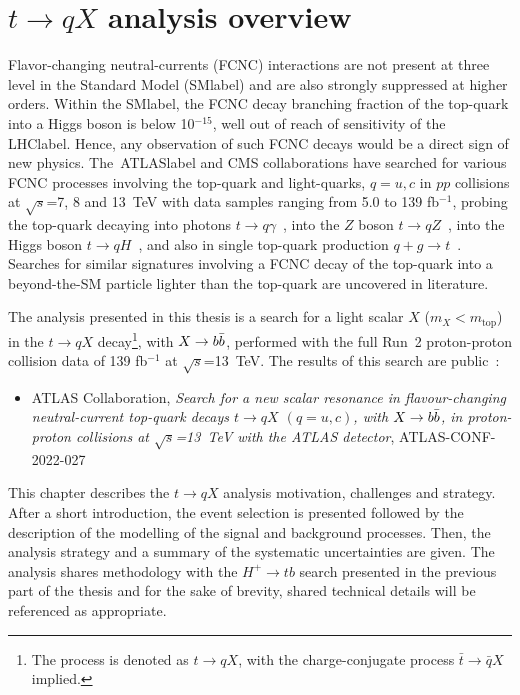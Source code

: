 \chapter{$t\to qX$ analysis overview}

Flavor-changing neutral-currents (FCNC) interactions are not present at three level in the Standard Model (\acrshort{SMlabel}) and are also strongly suppressed at higher orders. Within the \acrshort{SMlabel}, the FCNC decay branching fraction of the top-quark into a Higgs boson is below 10$^{-15}$, well out of reach of sensitivity of the \acrshort{LHClabel}. Hence, any observation of such FCNC decays would be a direct sign of new physics.
The~\acrshort{ATLASlabel} and CMS collaborations have searched for various FCNC processes involving the top-quark and light-quarks, $q=u,c$ in $pp$ collisions at $\sqrt{s}$=7, 8 and 13~TeV with data samples ranging from 5.0 to 139 fb$^{-1}$, probing the top-quark decaying into photons $t\to q\gamma$~\cite{tqgamma2022,tqgamma2020,tqgamma2015CMS,Tumasyan_2022}, into the $Z$ boson $t\to qZ$~\cite{Sirunyan_2017,tqZ2018,ATLAS-CONF-2021-049,CMS-PAS-TOP-17-017}, into the Higgs boson $t\to qH$~\cite{ATLAStqHtautau,TOPQ-2017-07,CMStqHRun2,Khachatryan_2017}, and also in single top-quark production $q+g\to t$~\cite{tqgluon2016,tqgluon2021,tqgluon2017CMS}. Searches for similar signatures involving a FCNC decay of the top-quark into a beyond-the-SM particle lighter than the top-quark are uncovered in literature.

The analysis presented in this thesis is a search for a light scalar $X$ ($m_X < m_\text{top}$) in the $t\to qX$ decay\footnote{The process is denoted as $t\to qX$, with the charge-conjugate process $\bar{t}\to\bar{q}X$ implied.}, with $X\to b\bar{b}$, performed with the full Run~2 proton-proton collision data of 139 fb$^{-1}$ at $\sqrt{s}$=13~TeV. The results of this search are public~\cite{ATLAS-CONF-2022-027}:

\begin{itemize}
    \item ATLAS Collaboration, \textit{Search for a new scalar resonance in flavour-changing neutral-current top-quark decays $t\to qX$ $(q=u,c)$, with $X\to b\bar{b}$, in proton-proton collisions at $\sqrt{s}$=13~TeV with the ATLAS detector}, ATLAS-CONF-2022-027

\end{itemize}

This chapter describes the $t\to qX$ analysis motivation, challenges and strategy. After a short introduction, the event selection is presented followed by the description of the modelling of the signal and background processes. Then, the analysis strategy and a summary of the systematic uncertainties are given. The analysis shares methodology with the $H^+\to tb$ search presented in the previous part of the thesis and for the sake of brevity, shared technical details will be referenced as appropriate.

